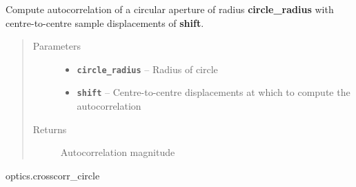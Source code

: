 \documentclass[a4paper,10pt,english]{sphinxmanual}
\begin{document}

\begin{fulllineitems}
\label{packages:optics.autocorr_circle}
Compute autocorrelation of a circular aperture of radius \textbf{circle\_radius} with centre-to-centre sample
displacements of \textbf{shift}.
\begin{quote}\begin{description}
\item[{Parameters}] \leavevmode\begin{itemize}
\item {} 
\textbf{\texttt{circle\_radius}} -- Radius of circle

\item {} 
\textbf{\texttt{shift}} -- Centre-to-centre displacements at which to compute the autocorrelation

\end{itemize}

\item[{Returns}] \leavevmode
Autocorrelation magnitude

\end{description}\end{quote}




optics.crosscorr\_circle



\end{fulllineitems}

\end{document}
